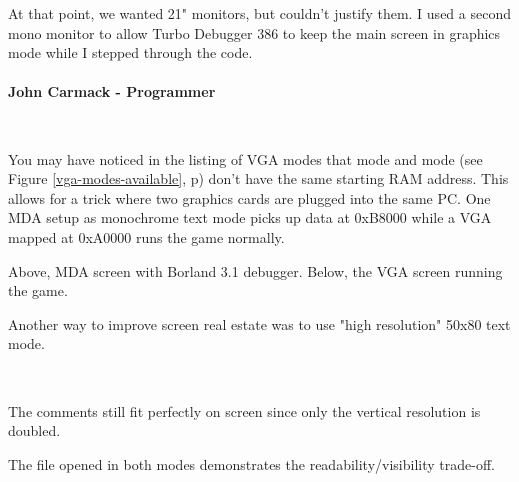 \documentclass[book.tex]{subfiles}
\begin{document}
\begin{fancyquotes}
At that point, we wanted 21" monitors, but couldn't justify them.  I used a second mono monitor to allow Turbo Debugger 386 to keep the main screen in graphics mode while I stepped through the code.\\
 \\
\textbf{John Carmack - Programmer}
\end{fancyquotes}\\
\par
\vspace{-5pt}
You may have noticed in the listing of VGA modes that mode  and mode  (see Figure \ref{vga-modes-available}, p\pageref{vga-modes-available})  don't have the same starting RAM address. This allows for a trick where two graphics cards are plugged into the same PC. One MDA setup as monochrome text mode picks up data at 0xB8000 while a VGA mapped at 0xA0000 runs the game normally.
      \\
      \par
Above, MDA screen with Borland 3.1 debugger. Below, the VGA screen running the game.\\

\pagebreak
\par

Another way to improve screen real estate was to use "high resolution" 50x80 text mode.\\
\par 
 \\
 \par
 \vspace{-7pt}
The comments still fit perfectly on screen since only the vertical resolution is doubled.\\
\par
\vspace{-4pt}
 The file  opened in both modes demonstrates the readability/visibility trade-off.\\
\par
\end{document}
